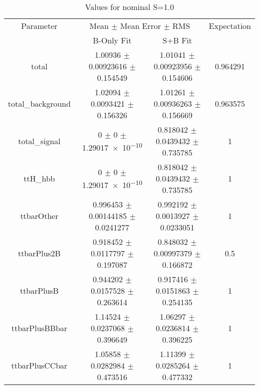 \begin{table}
\centering
\caption{Values for nominal S=1.0}
\begin{tabular}{cccc}
\toprule
Parameter & \multicolumn{2}{c}{Mean $\pm$ Mean Error $\pm$ RMS} & Expectation\\
 & B-Only Fit & S+B Fit & \\
\midrule
total & \num{1.00936} $\pm$ \num{0.00923616} $\pm$ \num{0.154549} & \num{1.01041} $\pm$ \num{0.00923956} $\pm$ \num{0.154606} & \num{0.964291}\\
total\_background & \num{1.02094} $\pm$ \num{0.0093421} $\pm$ \num{0.156326} & \num{1.01261} $\pm$ \num{0.00936263} $\pm$ \num{0.156669} & \num{0.963575}\\
total\_signal & \num{0} $\pm$ \num{0} $\pm$ \num{1.29017e-10} & \num{0.818042} $\pm$ \num{0.0439432} $\pm$ \num{0.735785} & \num{1}\\
ttH\_hbb & \num{0} $\pm$ \num{0} $\pm$ \num{1.29017e-10} & \num{0.818042} $\pm$ \num{0.0439432} $\pm$ \num{0.735785} & \num{1}\\
ttbarOther & \num{0.996453} $\pm$ \num{0.00144185} $\pm$ \num{0.0241277} & \num{0.992192} $\pm$ \num{0.0013927} $\pm$ \num{0.0233051} & \num{1}\\
ttbarPlus2B & \num{0.918452} $\pm$ \num{0.0117797} $\pm$ \num{0.197087} & \num{0.848032} $\pm$ \num{0.00997379} $\pm$ \num{0.166872} & \num{0.5}\\
ttbarPlusB & \num{0.944202} $\pm$ \num{0.0157528} $\pm$ \num{0.263614} & \num{0.917416} $\pm$ \num{0.0151863} $\pm$ \num{0.254135} & \num{1}\\
ttbarPlusBBbar & \num{1.14524} $\pm$ \num{0.0237068} $\pm$ \num{0.396649} & \num{1.06297} $\pm$ \num{0.0236814} $\pm$ \num{0.396225} & \num{1}\\
ttbarPlusCCbar & \num{1.05858} $\pm$ \num{0.0282984} $\pm$ \num{0.473516} & \num{1.11399} $\pm$ \num{0.0285264} $\pm$ \num{0.477332} & \num{1}\\
\bottomrule
\end{tabular}
\end{table}